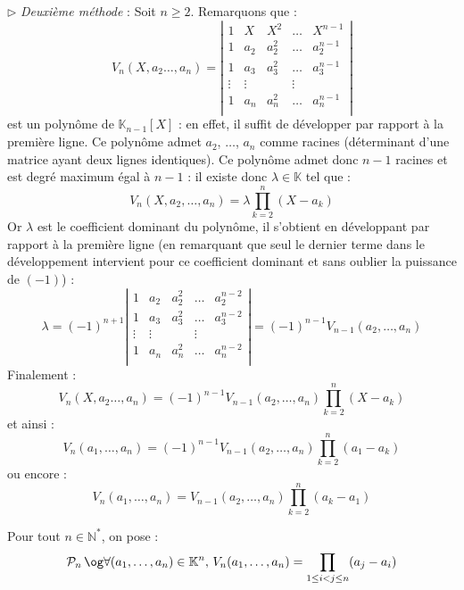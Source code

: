 \documentclass[french,11pt,twoside]{VcCours}
\begin{document}
\begin{Demonstration}{}
$\rhd$ \emph{Deuxième méthode} : Soit $n \geq 2$. Remarquons que :
$$ V_n(X, a_2 \ldots, a_n) = \left\vert \begin{array}{ccccc}
1 & X & X^2 & \ldots & X^{n-1} \\
1 & a_2 & a_2^2 & \ldots & a_2^{n-1} \\
1 & a_3 & a_3^2 & \ldots & a_3^{n-1} \\
\vdots & \vdots & & \vdots \\
1 & a_n & a_n^2 & \ldots & a_n^{n-1} \\
\end{array}\right\vert$$
est un polynôme de $\mathbb{K}_{n-1}[X]$ : en effet, il suffit de développer par rapport à la première ligne. Ce polynôme admet $a_2$, $\ldots$, $a_{n}$ comme racines (déterminant d'une matrice ayant deux lignes identiques). Ce polynôme admet donc $n-1$ racines et est degré maximum égal à $n-1$ : il existe donc $\lambda \in \mathbb{K}$ tel que :
$$ V_n(X, a_2, \ldots, a_n) = \lambda \prod_{k=2}^{n} (X-a_k) $$
Or $\lambda$ est le coefficient dominant du polynôme, il s'obtient en développant par rapport à la première ligne (en remarquant que seul le dernier terme dans le développement intervient pour ce coefficient dominant et sans oublier la puissance de $(-1)$) : 
$$ \lambda =  (-1)^{n+1} \left\vert \begin{array}{ccccc}
1 & a_2 & a_2^2 & \ldots & a_2^{n-2} \\
1 & a_3 & a_3^2 & \ldots & a_3^{n-2} \\
\vdots & \vdots & & \vdots \\
1 & a_n & a_n^2 & \ldots & a_n^{n-2} \\
\end{array}\right\vert =  (-1)^{n-1} V_{n-1}(a_2, \ldots, a_n)$$
Finalement :
$$ V_n(X, a_2\ldots, a_n) =  (-1)^{n-1} V_{n-1}(a_2, \ldots, a_n) \prod_{k=2}^{n} (X-a_k)$$
et ainsi :
$$ V_n(a_1, \ldots, a_n) =  (-1)^{n-1} V_{n-1}(a_2, \ldots, a_n) \prod_{k=2}^{n} (a_1-a_k)$$
ou encore :
$$ V_n(a_1, \ldots, a_n) =   V_{n-1}(a_2, \ldots, a_n) \prod_{k=2}^{n} (a_k-a_1)$$

\medskip



\phantom{$\rhd$ Prouvons maintenant le résultat souhaitée par récurrence. }

Pour tout $n \in \mathbb{N}^*$, on pose :
$$ \mathcal{P}_n \, \hbox{\og} \forall (a_1, \ldots, a_n) \in \mathbb{K}^n, \, V_n(a_1, \ldots, a_n) = \prod_{1 \leq i<j \leq n} (a_j-a_i)$$


\end{Demonstration}
\end{document}
